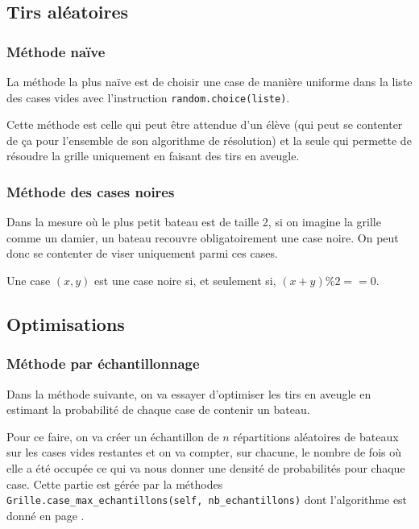 \subsection{Tirs aléatoires}

\subsubsection{Méthode naïve}
La méthode la plus naïve est de choisir une case de manière uniforme dans la liste des cases vides avec l'instruction \texttt{random.choice(liste)}.

Cette méthode est celle qui peut être attendue d'un élève (qui peut se contenter de ça pour l'ensemble de son algorithme de résolution) et la seule qui permette de résoudre la grille uniquement en faisant des tirs en aveugle.

\subsubsection{Méthode des cases noires}
Dans la mesure où le plus petit bateau est de taille 2, si on imagine la grille comme un damier, un bateau recouvre obligatoirement une case noire. On peut donc se contenter de viser uniquement parmi ces cases.

Une case $(x,y)$ est une case noire si, et seulement si, $(x+y)\%2==0$.

\subsection{Optimisations}

\subsubsection{Méthode par échantillonnage}
Dans la méthode suivante, on va essayer d'optimiser les tirs en aveugle en estimant la probabilité de chaque case de contenir un bateau.

Pour ce faire, on va créer un échantillon de $n$ répartitions aléatoires de bateaux sur les cases vides restantes et on va compter, sur chacune, le nombre de fois où elle a été occupée ce qui va nous donner une densité de probabilités pour chaque case. Cette partie est gérée par la méthodes \texttt{Grille.case\_max\_echantillons(self, nb\_echantillons)} dont l'algorithme est donné en page \pageref{case_max_echantillons}.

